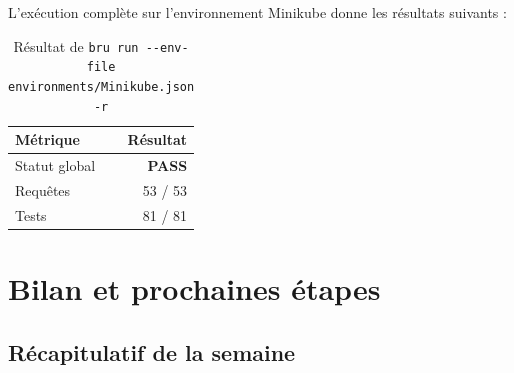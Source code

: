 \documentclass[12pt,a4paper]{article}
\begin{document}
L'ex\'{e}cution compl\`{e}te sur l'environnement Minikube donne les r\'{e}sultats suivants :

\begin{table}[H]
\centering
\small
\begin{tabular}{|l|r|}
  \hline
  \rowcolor{primary!15}
  \textbf{M\'{e}trique} & \textbf{R\'{e}sultat} \\
  \hline
  Statut global  & \textcolor{success}{\textbf{PASS}} \\
  Requ\^{e}tes  & 53 / 53 \\
  Tests          & 81 / 81 \\
  \hline
\end{tabular}
\caption{R\'{e}sultat de \texttt{bru run -{}-env-file environments/Minikube.json -r}}
\end{table}

\newpage
\section{Bilan et prochaines \'{e}tapes}

\subsection{R\'{e}capitulatif de la semaine}
\end{document}
